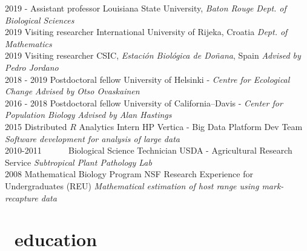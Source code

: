 \documentclass[]{CV}
\begin{document}
\begin{entrylist}

  \entry
    {2019 - }
    {Assistant professor}
    {Louisiana State University, \textit{Baton Rouge}}
    {\emph{Dept. of Biological Sciences}} \\


  \entry
    {2019}
    {Visiting researcher}
    {International University of Rijeka, Croatia}
    {\emph{Dept. of Mathematics}} \\

  \entry
    {2019}
    {Visiting researcher}
    {CSIC, \textit{Estación Biológica de Doñana}, Spain}
    {\emph{Advised by Pedro Jordano}} \\

  \entry
    {2018 - 2019}
    {Postdoctoral fellow}
    {University of Helsinki - \textit{Centre for Ecological Change}}
    {\emph{Advised by Otso Ovaskainen}} \\


  \entry
    {2016 - 2018}
		{Postdoctoral fellow}
    {University of California--Davis - \textit{Center for Population Biology}}
    {\emph{Advised by Alan Hastings}} \\


  \entry
    {2015}
    {Distributed $R$ Analytics Intern}
    {HP Vertica - Big Data Platform Dev Team}
    {\emph{Software development for analysis of large data}} \\

  \entry
    {2010-2011 \ \ \ \ \ }
    {Biological Science Technician}
    {USDA - Agricultural Research Service}
    {\emph{Subtropical Plant Pathology Lab }} \\

  \entry
    {2008}
    {Mathematical Biology Program}
    {NSF Research Experience for Undergraduates (REU)}
    {\emph{Mathematical estimation of host range using mark-recapture data}}
\end{entrylist}





\section{\faGraduationCap \  education}
\end{document}
